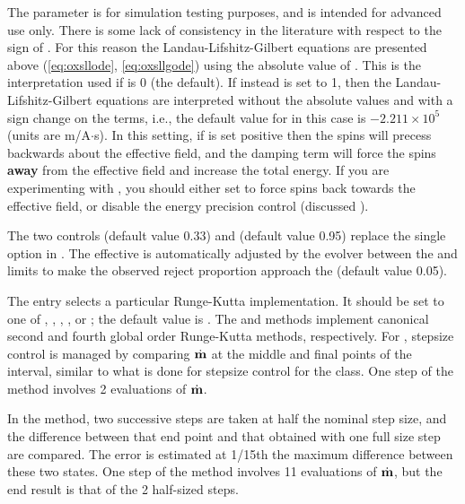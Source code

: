\begin{description}
The  parameter is for simulation testing
purposes, and is intended for advanced use only.  There is some lack of
consistency in the literature with respect to the sign of
\abovemath{\gamma}.  For this reason the Landau-Lifshitz-Gilbert
equations are presented above (\ref{eq:oxsllode}, \ref{eq:oxsllgode})
using the absolute value of \abovemath{\gamma}.  This is the
interpretation used if  is 0 (the default).  If
instead  is set to 1, then the
Landau-Lifshitz-Gilbert equations are interpreted without the absolute
values and with a sign change on the \abovemath{\gamma} terms, i.e., the
default value for \abovemath{\gamma} in this case is $-2.211 \times
10^5$ (units are m/A$\cdot$s).  In this setting, if \abovemath{\gamma}
is set positive then the spins will precess backwards about the
effective field, and the damping term will force the spins \textbf{away}
from the effective field and increase the total energy.  If you are
experimenting with , you should either set
 to force spins back towards the effective field,
or disable the energy precision control (discussed
).

The two controls  (default value 0.33) and
 (default value 0.95) replace the single
 option in .  The effective
 is automatically adjusted by the evolver between the
 and  limits to make the
observed reject proportion approach the  (default
value 0.05).

The  entry selects a particular Runge-Kutta
implementation.  It should be set to one of ,
, , , or ;
the default value is .  The  and
 methods implement canonical second and fourth global order
Runge-Kutta methods\cite{stoer93}, respectively.  For ,
stepsize control is managed by comparing $\dot{\textbf{m}}$ at the middle and
final points of the interval, similar to what is done for stepsize
control for the  class.  One step of the
 method involves 2 evaluations of $\dot{\textbf{m}}$.

In the  method, two successive steps are taken at half the
nominal step size, and the difference between that end point and that
obtained with one full size step are compared.  The error is estimated at
1/15th the maximum difference between these two states.  One step of the
 method involves 11 evaluations of $\dot{\textbf{m}}$, but the
end result is that of the 2 half-sized steps.


\end{description}
